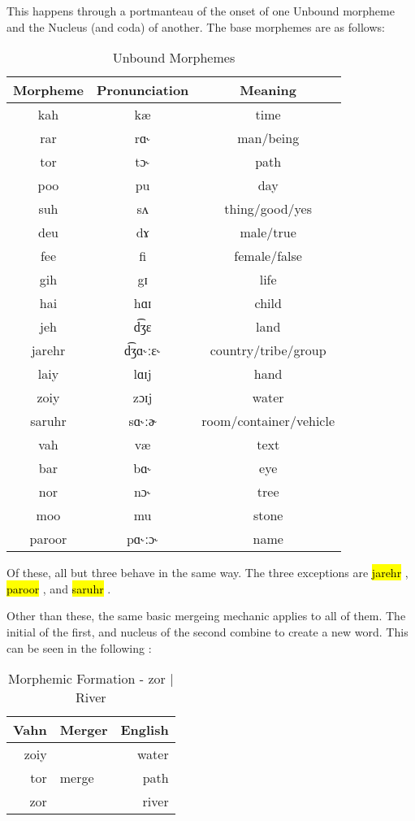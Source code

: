 \documentclass{article}
\newcommand{\hlv}[2][gray]{ {\sethlcolor{#1} \hl{#2}} }
\begin{document}
This happens through a portmanteau of the onset of one Unbound morpheme and the Nucleus (and coda) of another. The base morphemes are as follows:

\begin{table}[H]
\centering
\begin{tabular}{c|c|c}
 Morpheme & Pronunciation & Meaning \\
 \hline
 kah & kæ & time \\
 rar & rɑ˞ & man/being \\
 tor & tɔ˞ & path \\
 poo & pu & day \\
 suh & sʌ & thing/good/yes\\
 deu & dɤ & male/true \\
 fee & fi & female/false \\
 gih & gɪ & life \\
 hai & hɑɪ & child \\
 jeh & d͡ʒɛ & land \\
 jarehr & d͡ʒɑ˞ːɛ˞ & country/tribe/group \\
 laiy & lɑɪj & hand \\
 zoiy & zɔɪj & water \\
 saruhr & sɑ˞ːɚ & room/container/vehicle \\
 vah & væ & text \\
 bar & bɑ˞ & eye \\
 nor & nɔ˞ & tree \\
 moo & mu & stone \\
 paroor & pɑ˞ːɔ˞ & name \\
\end{tabular}
\caption{Unbound Morphemes}
\label{Unbound Morphemes}
\end{table}

Of these, all but three behave in the same way. The three exceptions are \hlv{jarehr}, \hlv{paroor}, and \hlv{saruhr}.

Other than these, the same basic mergeing mechanic applies to all of them. The initial of the first, and nucleus of the second combine to create a new word. This can be seen in the following :

\begin{table}[H]
\centering
\begin{tabular}{r|l||r}
Vahn     & Merger & English  \\
\hline\hline
zoiy &       & water      \\
tor & merge  & path    \\
\hline \hline
zor &        & river
\end{tabular}
\caption{Morphemic Formation - zor | River}
\label{Morphemic Formation - zor | River}
\end{table}
\end{document}

